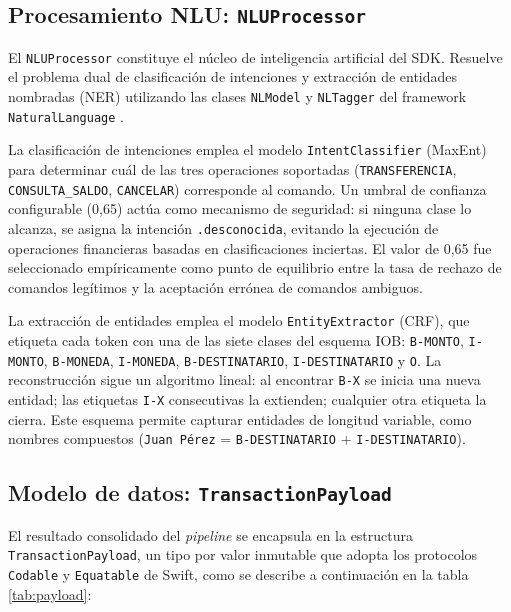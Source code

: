 \subsection{Procesamiento NLU: \texttt{NLU\allowbreak{}Processor}}

El \texttt{NLU\allowbreak{}Processor} constituye el núcleo de inteligencia artificial del SDK. Resuelve el problema dual de clasificación de intenciones y extracción de entidades nombradas (NER) utilizando las clases \texttt{NLModel} y \texttt{NLTagger} del framework \texttt{Natural\allowbreak{}Language} \citep{apple-naturallanguage}.

La clasificación de intenciones emplea el modelo \texttt{Intent\allowbreak{}Classifier} (MaxEnt) para determinar cuál de las tres operaciones soportadas (\texttt{TRANSFERENCIA}, \texttt{CONSULTA\_SALDO}, \texttt{CANCELAR}) corresponde al comando. Un umbral de confianza configurable (0,65) actúa como mecanismo de seguridad: si ninguna clase lo alcanza, se asigna la intención \texttt{.desconocida}, evitando la ejecución de operaciones financieras basadas en clasificaciones inciertas. El valor de 0,65 fue seleccionado empíricamente como punto de equilibrio entre la tasa de rechazo de comandos legítimos y la aceptación errónea de comandos ambiguos.

La extracción de entidades emplea el modelo \texttt{Entity\allowbreak{}Extractor} (CRF), que etiqueta cada token con una de las siete clases del esquema IOB: \texttt{B-MONTO}, \texttt{I-MONTO}, \texttt{B-MONEDA}, \texttt{I-MONEDA}, \texttt{B-DESTINATARIO}, \texttt{I-DESTINATARIO} y \texttt{O}. La reconstrucción sigue un algoritmo lineal: al encontrar \texttt{B-X} se inicia una nueva entidad; las etiquetas \texttt{I-X} consecutivas la extienden; cualquier otra etiqueta la cierra. Este esquema permite capturar entidades de longitud variable, como nombres compuestos (\texttt{Juan Pérez} = \texttt{B-DESTINATARIO} + \texttt{I-DESTINATARIO}).

\subsection{Modelo de datos: \texttt{Transaction\allowbreak{}Payload}}

El resultado consolidado del \textit{pipeline} se encapsula en la estructura \texttt{Transaction\allowbreak{}Payload}, un tipo por valor inmutable que adopta los protocolos \texttt{Codable} y \texttt{Equatable} de Swift, como se describe a continuación en la tabla \ref{tab:payload}:

